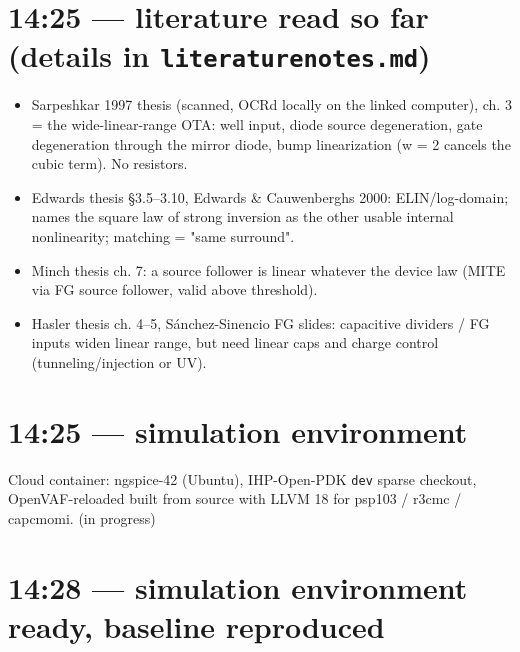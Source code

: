 \documentclass[11pt,a4paper]{article}
\providecommand{\tightlist}{\setlength{\itemsep}{0pt}\setlength{\parskip}{0pt}}
\renewcommand{\_}{\textunderscore\hspace{0pt}}
\begin{document}
\hypertarget{1425--literature-read-so-far-details-in-literature_notesmd}{%
\section{\texorpdfstring{14:25 --- literature read
so far (details in
\texttt{literature\_notes.md})}{14:25 --- literature read so far (details in literature\_notes.md)}}\label{1425--literature-read-so-far-details-in-literature_notesmd}}

\begin{itemize}
\tightlist
\item
  Sarpeshkar 1997 thesis (scanned,
  OCR\textquotesingle d locally on the linked
  computer), ch. 3 = the wide-linear-range OTA:
  well input, diode source degeneration, gate
  degeneration through the mirror diode, bump
  linearization (w = 2 cancels the cubic term). No
  resistors.
\item
  Edwards thesis §3.5--3.10, Edwards \&
  Cauwenberghs 2000: ELIN/log-domain; names the
  square law of strong inversion as the other
  usable internal nonlinearity; matching = "same
  surround".
\item
  Minch thesis ch. 7: a source follower is linear
  whatever the device law (MITE via FG source
  follower, valid above threshold).
\item
  Hasler thesis ch. 4--5, Sánchez-Sinencio FG
  slides: capacitive dividers / FG inputs widen
  linear range, but need linear caps and charge
  control (tunneling/injection or UV).
\end{itemize}

\hypertarget{1425--simulation-environment}{%
\section{14:25 --- simulation
environment}\label{1425--simulation-environment}}

Cloud container: ngspice-42 (Ubuntu), IHP-Open-PDK
\texttt{dev} sparse checkout, OpenVAF-reloaded
built from source with LLVM 18 for psp103 /
r3\_cmc / cap\_cmomi. (in progress)

\hypertarget{1428--simulation-environment-ready-baseline-reproduced}{%
\section{14:28 --- simulation environment ready,
baseline
reproduced}\label{1428--simulation-environment-ready-baseline-reproduced}}
\end{document}
